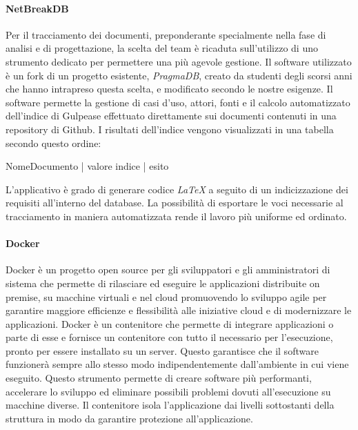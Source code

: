 		\paragraph{NetBreakDB}
		Per il tracciamento dei documenti, preponderante specialmente nella fase di analisi e di progettazione, la scelta del team è ricaduta sull'utilizzo di uno strumento dedicato per permettere una più agevole gestione. Il software utilizzato è un fork di un progetto esistente, \textit{PragmaDB}, creato da studenti degli scorsi anni che hanno intrapreso questa scelta, e modificato secondo le nostre esigenze. Il software permette la gestione di casi d'uso, attori, fonti e il calcolo automatizzato dell'indice di Gulpease effettuato direttamente sui documenti contenuti in una repository di Github. I risultati dell'indice vengono visualizzati in una tabella secondo questo ordine:
		\begin{center}
			NomeDocumento | valore indice | esito
		\end{center}
		L'applicativo è grado di generare codice \textit{\LaTeX{}} a seguito di un indicizzazione dei requisiti all'interno del database. La possibilità di esportare le voci necessarie al tracciamento in maniera automatizzata rende il lavoro più uniforme ed ordinato.
		
		\paragraph{Docker}
		Docker è un progetto open source per gli sviluppatori e gli amministratori di sistema che permette di rilasciare ed eseguire le applicazioni distribuite on premise, su macchine virtuali e nel cloud promuovendo lo sviluppo agile per garantire maggiore efficienze e flessibilità alle iniziative cloud e di modernizzare le applicazioni. Docker è un contenitore che permette di integrare applicazioni o parte di esse e fornisce un contenitore con tutto il necessario per l'esecuzione, pronto per essere installato su un server. Questo garantisce che il software funzionerà sempre allo stesso modo indipendentemente dall'ambiente in cui viene eseguito. Questo strumento permette di creare software più performanti, accelerare lo sviluppo ed eliminare possibili problemi dovuti all'esecuzione su macchine diverse. Il contenitore isola l'applicazione dai livelli sottostanti della struttura in modo da garantire protezione all'applicazione. 
			
